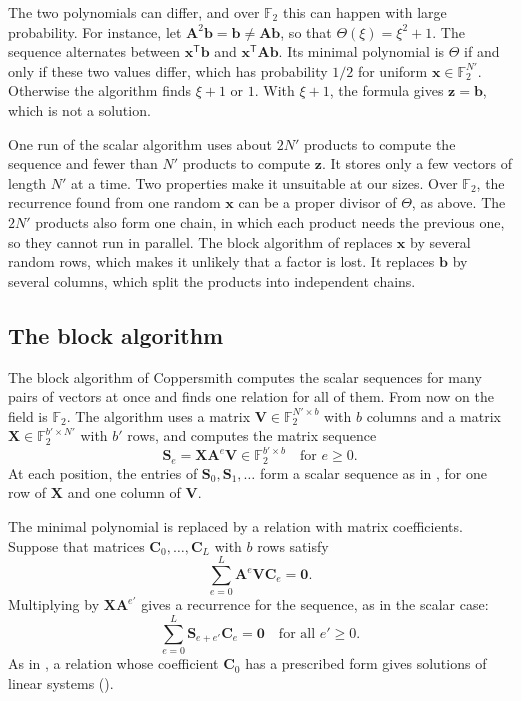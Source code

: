 \documentclass[b5paper, 10pt, abstract=true, captions=tableheading]{scrartcl}
\theoremstyle{plain}
\theoremstyle{definition}
\newcommand{\FF}{\mathds{F}}
\newcommand{\tr}{\mathsf{T}}
\renewcommand{\vec}[1]{\symbf{#1}}
\newcommand{\mat}[1]{\symbf{#1}}
\begin{document}
The two polynomials can differ, and over $\FF_2$ this can happen with
large probability. For instance, let $\mat A^2\vec b=\vec b\neq\mat A\vec b$, so that
$\Theta(\xi)=\xi^2+1$. The sequence alternates between $\vec x^\tr\vec b$
and $\vec x^\tr\mat A\vec b$. Its minimal polynomial is $\Theta$ if and only
if these two values differ, which has probability $1/2$ for uniform
$\vec x\in\FF_2^{N'}$. Otherwise the algorithm finds $\xi+1$ or $1$. With
$\xi+1$, the formula gives $\vec z=\vec b$, which is not a solution.

One run of the scalar algorithm uses about $2N'$ products to compute the
sequence and fewer than $N'$ products to compute $\vec z$. It stores only a
few vectors of length $N'$ at a time. Two properties make it unsuitable at
our sizes. Over $\FF_2$, the recurrence found from one random $\vec x$ can
be a proper divisor of $\Theta$, as above. The $2N'$ products also form one
chain, in which each product needs the previous one, so they cannot run in
parallel. The block algorithm of  replaces
$\vec x$ by several random rows, which makes it unlikely that a factor is
lost. It replaces $\vec b$ by several columns, which split the products into
independent chains.

\subsection{The block algorithm}
\label{subsec:wiedemann-block}
The block algorithm of Coppersmith \cite{Coppersmith1994} computes the
scalar sequences for many pairs of vectors at once and finds one relation
for all of them. From now on the field is $\FF_2$. The algorithm uses a
matrix $\mat V\in\FF_2^{N'\times b}$ with $b$ columns and a matrix
$\mat X\in\FF_2^{b'\times N'}$ with $b'$ rows, and computes the matrix
sequence
\[
  \mat S_e=\mat X\mat A^e\mat V\in\FF_2^{b'\times b}
  \quad\text{for }e\geq0.
\]
At each position, the entries of $\mat S_0,\mat S_1,\ldots$ form a scalar
sequence as in , for one row of $\mat X$ and
one column of $\mat V$.

The minimal polynomial is replaced by a relation with matrix
coefficients. Suppose that matrices $\mat C_0,\ldots,\mat C_L$ with $b$
rows satisfy
\begin{equation}\label{eq:wiedemann-vector-relation}
  \sum_{e=0}^{L}\mat A^e\mat V\mat C_e=\mat 0.
\end{equation}
Multiplying by $\mat X\mat A^{e'}$ gives a recurrence for the sequence,
as in the scalar case:
\begin{equation}\label{eq:wiedemann-sequence-relation}
  \sum_{e=0}^{L}\mat S_{e+e'}\mat C_e=\mat 0
  \quad\text{for all }e'\geq0.
\end{equation}
As in , a relation whose coefficient
$\mat C_0$ has a prescribed form gives solutions of linear systems
().
\end{document}
